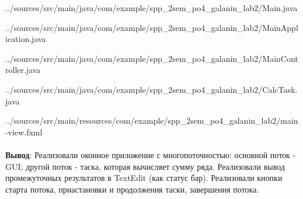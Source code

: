 \documentclass[12pt, a4paper, simple]{eskdtext}
\begin{document}
    
    {../sources/src/main/java/com/example/spp_2sem_po4_galanin_lab2/Main.java}
        
    
    {../sources/src/main/java/com/example/spp_2sem_po4_galanin_lab2/MainApplication.java}

    
    {../sources/src/main/java/com/example/spp_2sem_po4_galanin_lab2/MainController.java}

    \newpage
    
    {../sources/src/main/java/com/example/spp_2sem_po4_galanin_lab2/CalcTask.java}

    
    {../sources/src/main/resources/com/example/spp_2sem_po4_galanin_lab2/main-view.fxml}


    \paragraph{} \textbf{Вывод}:
    Реализовали оконное приложение с многопоточностью:
    основной поток - GUI;
    другой поток - таска, которая вычисляет сумму ряда.
    Реализовали вывод промежуточных результатов в TextEdit (как статус бар).
    Реализовали кнопки старта потока, приастановки и продолжения таски, завершения потока.

\end{document}
